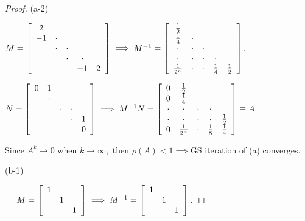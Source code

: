 \documentclass[11pt,a4paper]{article}
\renewcommand{\(}{\left(}
\renewcommand{\)}{\right)}
\begin{document}
\begin{proof}
  	\bigskip(a-2)
  	
  	$M=\left[
  	\begin{array}
  	[c]{ccccc}%
  	2 &  &  &  & \\
  	-1 & \cdot &  &  & \\
  	& \cdot & \cdot &  & \\
  	&  & \cdot & \cdot & \\
  	&  &  & -1 & 2
  	\end{array}
  	\right]  \implies M^{-1}=\left[
  	\begin{array}
  	[c]{ccccc}%
  	\frac{1}{2} &  &  &  & \\
  	\frac{1}{4} & \cdot &  &  & \\
  	\cdot & \cdot & \cdot &  & \\
  	\cdot & \cdot & \cdot & \cdot & \\
  	\frac{1}{2^{n}} & \cdot & \cdot & \frac{1}{4} & \frac{1}{2}%
  	\end{array}
  	\right]  .$
  	
  	$N=\left[
  	\begin{array}
  	[c]{ccccc}%
  	0 & 1 &  &  & \\
  	& \cdot & \cdot &  & \\
  	&  & \cdot & \cdot & \\
  	&  &  & \cdot & 1\\
  	&  &  &  & 0
  	\end{array}
  	\right]  \implies M^{-1}N=\left[
  	\begin{array}
  	[c]{ccccc}%
  	0 & \frac{1}{2} &  &  & \\
  	0 & \frac{1}{4} & \cdot &  & \\
  	\cdot & \cdot & \cdot & \cdot & \\
  	\cdot & \cdot & \cdot & \cdot & \frac{1}{2}\\
  	0 & \frac{1}{2^{n}} & \cdot & \frac{1}{8} & \frac{1}{4}%
  	\end{array}
  	\right]  \equiv A.$
  	
  	Since $A^{k}\longrightarrow0$ when $k\longrightarrow\infty,$ then
  	$\rho(A)<1\implies$GS iteration of (a) converges.
  	
  	(b-1)
  	
  	\ \ $\ M=\left[
  	\begin{array}
  	[c]{ccc}%
  	1 &  & \\
  	& 1 & \\
  	&  & 1
  	\end{array}
  	\right]  \implies M^{-1}=\left[
  	\begin{array}
  	[c]{ccc}%
  	1 &  & \\
  	& 1 & \\
  	&  & 1
  	\end{array}
  	\right]  .$
  	

\end{proof}
\end{document}
